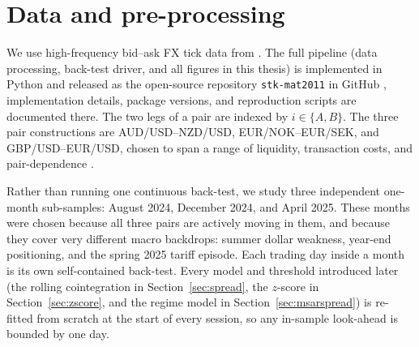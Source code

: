 
\section{Data and pre-processing}\label{sec:data}

We use high-frequency bid--ask FX tick data from \textcite{dukascopy}. The full pipeline (data processing, back-test driver, and all figures in this thesis) is implemented in Python and released as the open-source repository \texttt{stk-mat2011} in GitHub \parencite{furnes2026repo}, implementation details, package versions, and reproduction scripts are documented there. The two legs of a pair are indexed by $i \in \{A, B\}$. The three pair constructions are AUD/USD--NZD/USD, EUR/NOK--EUR/SEK, and GBP/USD--EUR/USD, chosen to span a range of liquidity, transaction costs, and pair-dependence \parencite{krauss2017statarb}.

Rather than running one continuous back-test, we study three independent one-month sub-samples: August 2024, December 2024, and April 2025. These months were chosen because all three pairs are actively moving in them, and because they cover very different macro backdrops: summer dollar weakness, year-end positioning, and the spring 2025 tariff episode. Each trading day inside a month is its own self-contained back-test. Every model and threshold introduced later (the rolling cointegration in Section~\ref{sec:spread}, the $z$-score in Section~\ref{sec:zscore}, and the regime model in Section~\ref{sec:msarspread}) is re-fitted from scratch at the start of every session, so any in-sample look-ahead is bounded by one day.

